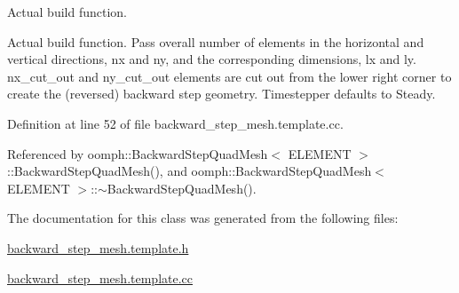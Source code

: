 Actual build function. 

Actual build function. Pass overall number of elements in the horizontal and vertical directions, nx and ny, and the corresponding dimensions, lx and ly. nx\+\_\+cut\+\_\+out and ny\+\_\+cut\+\_\+out elements are cut out from the lower right corner to create the (reversed) backward step geometry. Timestepper defaults to Steady. 

Definition at line 52 of file backward\+\_\+step\+\_\+mesh.\+template.\+cc.



Referenced by oomph\+::\+Backward\+Step\+Quad\+Mesh$<$ E\+L\+E\+M\+E\+N\+T $>$\+::\+Backward\+Step\+Quad\+Mesh(), and oomph\+::\+Backward\+Step\+Quad\+Mesh$<$ E\+L\+E\+M\+E\+N\+T $>$\+::$\sim$\+Backward\+Step\+Quad\+Mesh().



The documentation for this class was generated from the following files\+:\begin{DoxyCompactItemize}
\item 
\hyperlink{backward__step__mesh_8template_8h}{backward\+\_\+step\+\_\+mesh.\+template.\+h}\item 
\hyperlink{backward__step__mesh_8template_8cc}{backward\+\_\+step\+\_\+mesh.\+template.\+cc}\end{DoxyCompactItemize}
